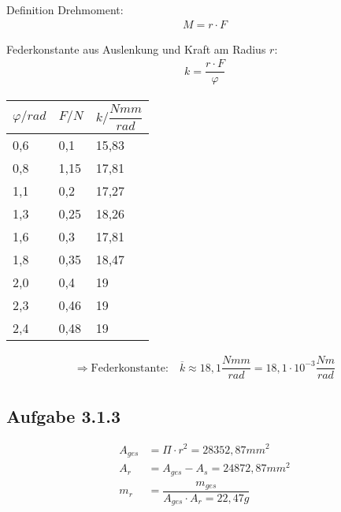 \documentclass[a4paper]{scrartcl}
\numberwithin{equation}{subsection}
\begin{document}
Definition Drehmoment:
\begin{align}
M = r \cdot F
\end{align}

Federkonstante aus Auslenkung und Kraft am Radius $r$:
\begin{align}
k = \dfrac{r \cdot F}{\varphi}
\end{align}

\begin{table}[]
\begin{tabular}{|l|l|l|}
\hline
\textbf{$\varphi/rad$} & \textbf{$F/N$} & \textbf{$k/\dfrac{Nmm}{rad}$} \\ \hline
0,6                    & 0,1            & 15,83                         \\ \hline
0,8                    & 1,15           & 17,81                         \\ \hline
1,1                    & 0,2            & 17,27                         \\ \hline
1,3                    & 0,25           & 18,26                         \\ \hline
1,6                    & 0,3            & 17,81                         \\ \hline
1,8                    & 0,35           & 18,47                         \\ \hline
2,0                    & 0,4            & 19                            \\ \hline
2,3                    & 0,46           & 19                            \\ \hline
2,4                    & 0,48           & 19                            \\ \hline
\end{tabular}
\end{table}

\begin{align*}
\Rightarrow \text{Federkonstante:} \quad \overline{k} \approx 18,1 \dfrac{Nmm}{rad} = 18,1 \cdot 10^{-3} \dfrac{Nm}{rad}
\end{align*}

\subsection{Aufgabe 3.1.3}

\begin{align}
A_{ges} &= \Pi \cdot r^2 = 28352,87mm^2 \\
A_r &= A_{ges} - A_s = 24872,87mm^2 \\
m_r &= \dfrac{m_{ges}}{A_{ges} \cdot A_r = 22,47g}
\end{align}
\end{document}
